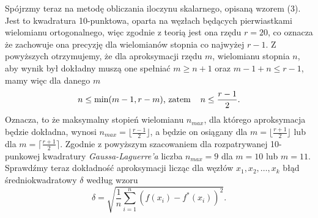 \documentclass[a4paper,12pt]{article}
\begin{document}
Spójrzmy teraz na metodę obliczania iloczynu skalarnego, opisaną wzorem (3). 
Jest to kwadratura 10-punktowa, oparta na węzłach będących pierwiastkami wielomianu ortogonalnego, więc zgodnie z teorią jest ona rzędu $r = 20$, co oznacza że zachowuje ona precyzję dla wielomianów stopnia co najwyżej $r - 1$.
Z powyższych otrzymujemy, że dla aproksymacji rzędu $m$, wielomianu stopnia $n$, aby wynik był dokładny muszą one spełniać $m \geq n + 1$ oraz $m - 1 + n \leq r -1$, mamy więc dla danego $m$
\begin{equation}
    n \leq \min(m - 1, r - m) \text{, zatem} \hspace{0.4cm} n \leq \frac{r-1}{2}.
\end{equation}
Oznacza, to że maksymalny stopień wielomianu $n_{max}$, dla którego aproksymacja będzie dokładna, wynosi 
$n_{max} = \lfloor \frac{r-1}{2}\rfloor$, a będzie on osiągany dla $m = \lfloor \frac{r+1}{2}\rfloor$ lub dla $m = \lceil \frac{r+1}{2}\rceil$. Zgodnie z powyższym szacowaniem dla rozpatrywanej 10-punkowej kwadratury \textit{Gaussa-Laguerre'a} liczba $n_{max} = 9$ dla $m = 10$ lub $m = 11$. Sprawdźmy teraz dokładność aproksymacji licząc dla węzłów $x_1,x_2,\hdots,x_k$ błąd średniokwadratowy $\delta$ według wzoru
\begin{equation*}
    \delta = \sqrt{\frac{1}{n} \sum^n_{i=1}(f(x_i) - f^*(x_i))^2}.
\end{equation*}
\end{document}
